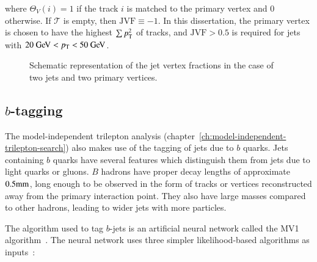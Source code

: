 where $\Theta_V(i)=1$ if the track $i$ is matched to the primary vertex and $0$ otherwise. If $\mathcal{T}$ is empty, then $\mathrm{JVF}\equiv -1$. In this dissertation, the primary vertex is chosen to have the highest $\sum p_{\text{T}}^2$ of tracks, and $\mathrm{JVF}>0.5$ is required for jets with $20 \GeV<\pt<50 \GeV$. 

\begin{figure}[htbp]
	\centering
	\caption{Schematic representation of the jet vertex fractions in the case of two jets and two primary vertices.}
	\label{fig:jvf-cartoon}
\end{figure}


\subsection{$b$-tagging}\label{sec:reco-bjets}
The model-independent trilepton analysis (chapter~\ref{ch:model-independent-trilepton-search}) also makes use of the tagging of jets due to $b$ quarks. Jets containing $b$ quarks have several features which distinguish them from jets due to light quarks or gluons. $B$ hadrons have proper decay lengths of approximate $0.5 \mathrm{mm}$, long enough to be observed in the form of tracks or vertices reconstructed away from the primary interaction point. They also have large masses compared to other hadrons, leading to wider jets with more particles. 

The algorithm used to tag $b$-jets is an artificial neural network called the MV1 algorithm~\cite{MV1}. The neural network uses three simpler likelihood-based algorithms as inputs~\cite{TheATLASCollaboration:2009ut,TheATLASCollaboration:2011wh}: 

